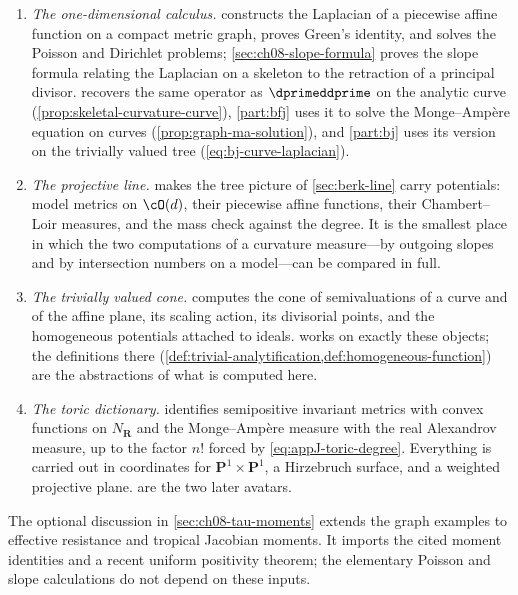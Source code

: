 \begin{enumerate}
\item \emph{The one-dimensional calculus.}  
constructs the Laplacian of a piecewise affine function on a compact metric
graph, proves Green's identity, and solves the Poisson and Dirichlet
problems; \cref{sec:ch08-slope-formula} proves the slope formula relating the
Laplacian on a skeleton to the retraction of a principal divisor.
 recovers the same
operator as $\dprimeddprime$ on the analytic curve
(\cref{prop:skeletal-curvature-curve}), \cref{part:bfj} uses it to solve the
Monge--Amp\`ere equation on curves (\cref{prop:graph-ma-solution}), and
\cref{part:bj} uses its version on the trivially valued tree
(\eqref{eq:bj-curve-laplacian}).

\item \emph{The projective line.}   makes the tree
picture of \cref{sec:berk-line} carry potentials: model metrics on
$\cO(d)$, their piecewise affine functions, their Chambert--Loir measures,
and the mass check against the degree.  It is the smallest place in which
the two computations of a curvature measure---by outgoing slopes and by
intersection numbers on a model---can be compared in full.

\item \emph{The trivially valued cone.}  
computes the cone of semivaluations of a curve and of the affine plane,
its scaling action, its divisorial points, and the homogeneous potentials
attached to ideals.   works on exactly these objects; the
definitions there (\cref{def:trivial-analytification,def:homogeneous-function})
are the abstractions of what is computed here.

\item \emph{The toric dictionary.}   identifies
semipositive invariant metrics with convex functions on $N_{\mathbf R}$ and the
Monge--Amp\`ere measure with the real Alexandrov measure, up to the factor
$n!$ forced by \eqref{eq:appJ-toric-degree}.  Everything is carried out in
coordinates for $\mathbf P^1\times\mathbf P^1$, a Hirzebruch surface, and a
weighted projective plane.  
are the two later avatars.
\end{enumerate}

The optional discussion in \cref{sec:ch08-tau-moments} extends the graph
examples to effective resistance and tropical Jacobian moments. It imports
the cited moment identities and a recent uniform positivity theorem; the
elementary Poisson and slope calculations do not depend on these inputs.

